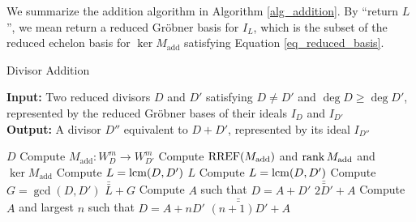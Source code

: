 
We summarize the addition algorithm in Algorithm \ref{alg_addition}.
By ``return $L$'', we mean return a reduced Gr\"obner basis for $I_L$,
which is the subset of the reduced echelon basis for $\ker M_{\text{add}}$ satisfying Equation \ref{eq_reduced_basis}.

\begin{algorithm}
  \label{alg_addition}
  \caption{Divisor Addition}
  {\bf Input:} Two reduced divisors $D$ and $D'$ satisfying $D \neq D'$ and $\deg D \geq \deg D'$,
  represented by the reduced Gr\"obner bases of their ideals $I_D$ and $I_{D'}$ \\
  {\bf Output:} A divisor $D''$ equivalent to $D + D'$, represented by its ideal $I_{D''}$
  \begin{algorithmic}[1]
      \State \Return $D$ \label{alg_addition:return_0}
    \EndIf
    \State Compute $M_{\text{add}} : W_D^m \to W_{D'}^m$
    \State Compute $\operatorname{RREF}(M_{\text{add}})$ and $\operatorname{rank} M_{\text{add}}$ and $\ker M_{\text{add}}$
      \State Compute $L = \operatorname{lcm}(D, D')$
      \State \Return $L$ \label{alg_addition:return_1}
    \EndIf
      \State Compute $L = \operatorname{lcm}(D, D')$
      \State Compute $G = \gcd(D, D')$
      \State \Return $\bar{\bar L} + G$ \label{alg_addition:return_2}
    \EndIf
        \State Compute $A$ such that $D = A + D'$
        \State \Return $\bar{\bar{2D'}} + A$ \label{alg_addition:return_3}
      \EndIf
        \State Compute $A$ and largest $n$ such that $D = A + nD'$
        \State \Return $\bar{\bar{(n+1)D'}} + A$ \label{alg_addition:return_4}
      \EndIf
    \EndIf
  \end{algorithmic}
\end{algorithm}

